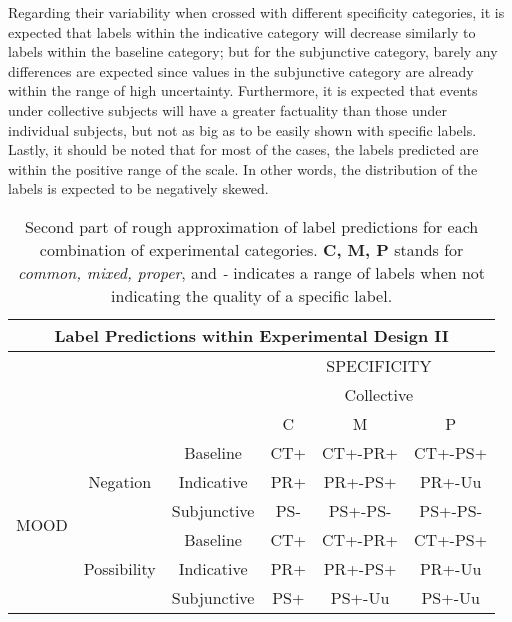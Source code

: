 Regarding their variability when crossed with different specificity categories, it is expected that labels within the indicative category will decrease similarly to labels within the baseline category; but for the subjunctive category, barely any differences are expected since values in the subjunctive category are already within the range of high uncertainty. Furthermore, it is expected that events under collective subjects will have a greater factuality than those under individual subjects, but not as big as to be easily shown with specific labels.\\

Lastly, it should be noted that for most of the cases, the labels predicted are within the positive range of the scale. In other words, the distribution of the labels is expected to be negatively skewed.\\

\begin{table}
\centering
\begin{tabular}{|c|c|c|c|c|c|}
\hline
\multicolumn{6}{|c|}{Label Predictions within Experimental Design II}\\\hline
                      & & &\multicolumn{3}{c|}{SPECIFICITY} \\\cline{4-6} 
                      & & &\multicolumn{3}{c|}{Collective}\\\cline{4-6} 
                      & & & C & M & P \\\hline 
\multirow{6}{*}{MOOD} & \multirow{3}{*}{Negation} & Baseline  & CT+ & CT+-PR+ & CT+-PS+\\\cline{3-6}
                      &                           & Indicative & PR+ & PR+-PS+ & PR+-Uu \\\cline{3-6}
                      &                           & Subjunctive  & PS- & PS+-PS- & PS+-PS-  \\ \cline{2-6}\cline{2-6}                     
                      &\multirow{3}{*}{Possibility}& Baseline & CT+ & CT+-PR+ & CT+-PS+\\\cline{3-6}
                      &                           & Indicative  & PR+ & PR+-PS+ & PR+-Uu\\\cline{3-6}
                      &                           & Subjunctive & PS+ & PS+-Uu & PS+-Uu \\\hline                                                          
\end{tabular}
\caption[Label predictions II.]{Second part of rough approximation of label predictions for each combination of experimental categories. \textbf{C, M, P} stands for \textit{common, mixed, proper}, and \textit{-} indicates a range of labels when not indicating the quality of a specific label.}
\label{tab:pilpredict2}
\end{table}

